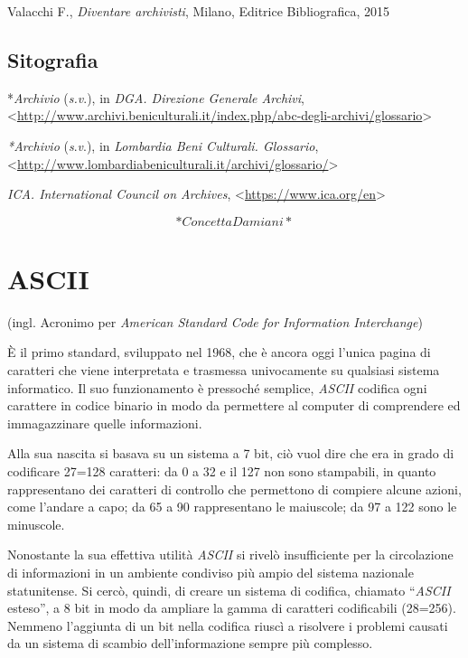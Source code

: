 \documentclass[
  b5paper,
  twoside,
  11pt,
  chapterprefix=false,
  bibliography=totocnumbered,
  parskip=0]{scrbook}
\begin{document}
Valacchi F., \emph{Diventare archivisti}, Milano, Editrice Bibliografica,
2015

\hypertarget{sitografia}{%
\section*{Sitografia}\label{sitografia}}

*\emph{Archivio} (\emph{s.v}.), in \emph{DGA. Direzione Generale Archivi},
\textless{}{\url{http://www.archivi.beniculturali.it/index.php/abc-degli-archivi/glossario}\textgreater{}}

\emph{*Archivio} (\emph{s}.\emph{v}.), in \emph{Lombardia Beni Culturali. Glossario},
\textless{}{\url{http://www.lombardiabeniculturali.it/archivi/glossario/}\textgreater{}}

\emph{ICA. International Council on Archives},
\textless{}{\url{https://www.ica.org/en}\textgreater{}}

\[*Concetta Damiani*\]

\hypertarget{ascii}{%
\chapter{ASCII}\label{ascii}}

(ingl. Acronimo per \emph{American Standard Code for Information
Interchange})

È il primo standard, sviluppato nel 1968, che è ancora oggi l'unica
pagina di caratteri che viene interpretata e trasmessa univocamente su
qualsiasi sistema informatico. Il suo funzionamento è pressoché
semplice, \emph{ASCII} codifica ogni carattere in codice binario in modo da
permettere al computer di comprendere ed immagazzinare quelle
informazioni.

Alla sua nascita si basava su un sistema a 7 bit, ciò vuol dire che era
in grado di codificare 27=128 caratteri: da 0 a 32 e il 127 non sono
stampabili, in quanto rappresentano dei caratteri di controllo che
permettono di compiere alcune azioni, come l'andare a capo; da 65 a 90
rappresentano le maiuscole; da 97 a 122 sono le minuscole.~

Nonostante la sua effettiva utilità \emph{ASCII} si rivelò insufficiente per
la circolazione di informazioni in un ambiente condiviso più ampio del
sistema nazionale statunitense. Si cercò, quindi, di creare un sistema
di codifica, chiamato \enquote{\emph{ASCII} esteso}, a 8 bit in modo da ampliare la
gamma di caratteri codificabili (28=256). Nemmeno l'aggiunta di un bit
nella codifica riuscì a risolvere i problemi causati da un sistema di
scambio dell'informazione sempre più complesso.
\end{document}

